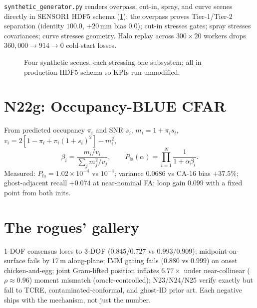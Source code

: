 \documentclass[11pt,oneside]{book}
\begin{document}
\texttt{synthetic\_generator.py} renders overpass, cut-in, spray, and curve
scenes directly in SENSOR1 HDF5 schema (\cref{fig:scenarios}): the overpass
proves Tier-1/Tier-2 separation (identity $100.0$, $+20\,\mathrm{mm}$ bias
$0.0$); cut-in stresses gates; spray stresses covariances; curve stresses
geometry. Halo replay across $300\times20$ workers drops $360{,}000\to914
\to0$ cold-start losses.

\begin{figure}[htbp]
\centering
{}
\caption{Four synthetic scenes, each stressing one subsystem; all in
production HDF5 schema so KPIs run unmodified.}
\label{fig:scenarios}
\end{figure}

\section{N22g: Occupancy-BLUE CFAR}
\label{sec:n22g}

From predicted occupancy $\pi_i$ and SNR $s_i$,
$m_i=1+\pi_is_i$,
$v_i=2[1-\pi_i+\pi_i(1+s_i)^2]-m_i^2$,
\begin{equation}
\boxed{\beta_i=\frac{m_i/v_i}{\sum_jm_j^2/v_j}},\qquad
\boxed{P_{\mathrm{fa}}(\alpha)=\prod_{i=1}^N\frac{1}{1+\alpha\beta_i}}.
\label{eq:blue}
\end{equation}
Measured: $P_{\mathrm{fa}}=1.02\times10^{-4}$ vs $10^{-4}$; variance
$0.0686$ vs CA-16 bias $+37.5\%$; ghost-adjacent recall $+0.074$ at
near-nominal FA; loop gain $0.099$ with a fixed point from both inits.

\section{The rogues' gallery}
\label{sec:rogues}

1-DOF consensus loses to 3-DOF ($0.845/0.727$ vs $0.993/0.909$);
midpoint-on-surface fails by $17\,\mathrm{m}$ along-plane; IMM gating fails
($0.880$ vs $0.999$) on onset chicken-and-egg; joint Gram-lifted position
inflates $6.77\times$ under near-collinear ($\rho\approx0.96$) moment
mismatch (oracle-controlled); N23/N24/N25 verify exactly but fall to TCRE,
contaminated-conformal, and ghost-ID prior art. Each negative ships with
the mechanism, not just the number.
\end{document}
